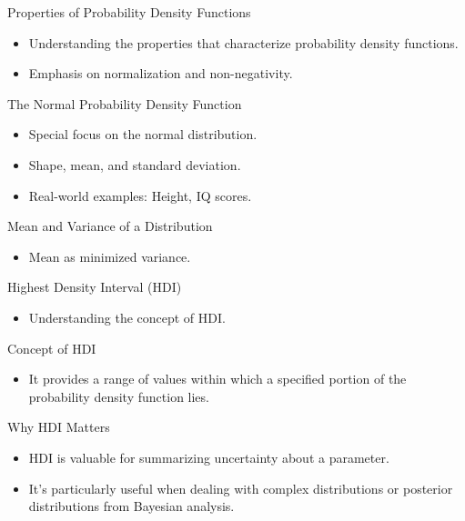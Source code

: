 \documentclass{beamer}
\begin{document}
\begin{frame}{Properties of Probability Density Functions}
  \begin{itemize}
    \item Understanding the properties that characterize probability density functions.
    \item Emphasis on normalization and non-negativity.
  \end{itemize}
\end{frame}

\begin{frame}{The Normal Probability Density Function}
  \begin{itemize}
    \item Special focus on the normal distribution.
    \item Shape, mean, and standard deviation.
    \item Real-world examples: Height, IQ scores.
  \end{itemize}
\end{frame}



\begin{frame}{Mean and Variance of a Distribution}
  \begin{itemize}
    \item Mean as minimized variance.
  \end{itemize}
\end{frame}

\begin{frame}{Highest Density Interval (HDI)}
  \begin{itemize}
    \item Understanding the concept of HDI.
  \end{itemize}
\end{frame}

\begin{frame}{Concept of HDI}
  \begin{itemize}
    \item It provides a range of values within which a specified portion of the probability density function lies.
  \end{itemize}
\end{frame}

\begin{frame}{Why HDI Matters}
  \begin{itemize}
    \item HDI is valuable for summarizing uncertainty about a parameter.
    \item It's particularly useful when dealing with complex distributions or posterior distributions from Bayesian analysis.
  \end{itemize}
\end{frame}
\end{document}
